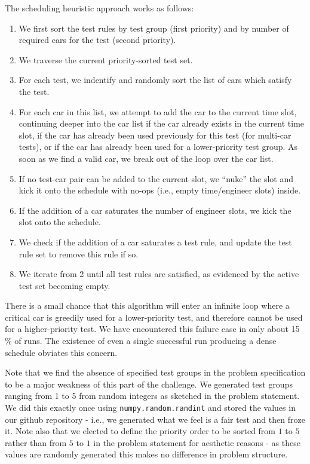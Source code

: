 \documentclass[aps,prl,twocolumn,superscriptaddress,groupedaddress]{revtex4}  %
\begin{document}
The scheduling heuristic approach works as follows:
\begin{enumerate}
\item We first sort the test rules by test group (first priority) and by
number of required cars for the test (second priority).
\item We traverse the current priority-sorted test set.
\item For each test, we indentify and randomly sort the list of cars which
satisfy the test.
\item For each car in this list, we attempt to add the car to the current time
slot, continuing deeper into the car list if the car already exists in the
current time slot, if the car has already been used previously for this test
(for multi-car tests), or if the car has already been used for a lower-priority
test group. As soon as we find a valid car, we break out of the loop over the
car list.
\item If no test-car pair can be added to the current slot, we ``nuke'' the slot
and kick it onto the schedule with no-ops (i.e., empty time/engineer slots) inside. 
\item If the addition of a car saturates the number of engineer slots, we kick
the slot onto the schedule.
\item We check if the addition of a car saturates a test rule, and update the
test rule set to remove this rule if so.
\item We iterate from 2 until all test rules are satisfied, as evidenced by the
active test set becoming empty.
\end{enumerate}

There is a small chance that this algorithm will enter an infinite loop where a
critical car is greedily used for a lower-priority test, and therefore cannot be
used for a higher-priority test. We have encountered this failure case in only
about 15$\%$ of runs. The existence of even a single successful run producing a
dense schedule obviates this concern. 

Note that we find the absence of specified test groups in the problem
specification to be a major weakness of this part of the challenge. We generated
test groups ranging from 1 to 5 from random integers as sketched in the problem
statement. We did this exactly once using \texttt{numpy.random.randint} and
stored the values in our github repository - i.e., we generated what we feel is
a fair test and then froze it. Note also that we elected to define the priority
order to be sorted from $1$ to $5$ rather than from $5$ to $1$ in the problem
statement for aesthetic reasons - as these values are randomly generated this
makes no difference in problem structure.
\end{document}

